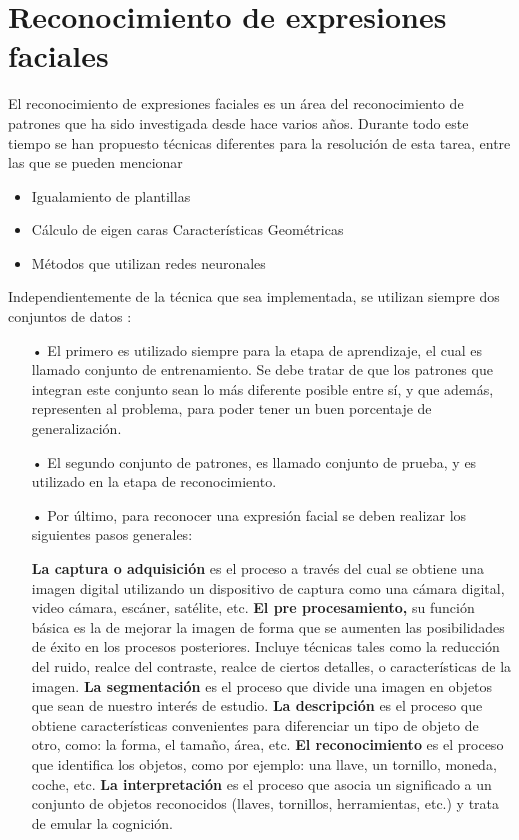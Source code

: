 \vskip 5cm

\section{Reconocimiento de expresiones faciales}

El reconocimiento de expresiones faciales es un área del reconocimiento de patrones que ha sido investigada desde hace varios años. Durante todo este tiempo se han propuesto técnicas diferentes para la resolución de esta tarea, entre las que se pueden mencionar \citep{Rafael}

\begin{itemize}
\item Igualamiento de plantillas
\item Cálculo de eigen caras Características Geométricas
\item Métodos que utilizan redes neuronales
\end{itemize}

Independientemente de la técnica que sea implementada, se utilizan siempre dos conjuntos de datos \citep{Santos}:

\begin{itemize}
\item[•] El primero es utilizado siempre para la etapa de aprendizaje, el cual es llamado conjunto de entrenamiento. Se debe tratar de que los patrones que integran este conjunto sean lo más diferente posible entre sí, y que además, representen al problema, para poder tener un buen porcentaje de generalización.
\item[•] El segundo conjunto de patrones, es llamado conjunto de prueba, y es utilizado en la etapa de reconocimiento.
\item[•] Por último, para reconocer una expresión facial se deben realizar los siguientes pasos generales: \vskip 0.1cm

{\bf La captura o adquisición} es el proceso a través del cual se obtiene una imagen digital utilizando un dispositivo de captura como una cámara digital, video cámara, escáner, satélite, etc.
\vskip 0.1cm
{\bf El pre procesamiento,} su función básica es la de mejorar la imagen de forma que se aumenten las posibilidades de éxito en los procesos posteriores. Incluye técnicas tales como la reducción del ruido, realce del contraste, realce de ciertos detalles, o características de la imagen. 
\vskip 0.1cm
{\bf La segmentación} es el proceso que divide una imagen en objetos que sean de nuestro interés de estudio. 
\vskip 0.1cm
{\bf La descripción} es el proceso que obtiene características convenientes para diferenciar un tipo de objeto de otro, como: la forma, el tamaño, área, etc.
\vskip 0.1cm
{\bf El reconocimiento} es el proceso que identifica los objetos, como por ejemplo: una llave, un tornillo, moneda, coche, etc.
\vskip 0.1cm
{\bf La interpretación} es el proceso que asocia un significado a un conjunto de objetos reconocidos (llaves, tornillos, herramientas, etc.) y trata de emular la cognición.

\end{itemize}

